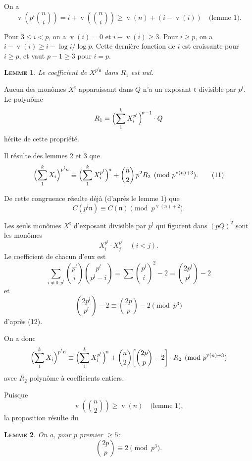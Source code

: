 \documentclass[12pt]{amsart}
\theoremstyle{plain}
\newtheorem{lem}{\textsc{Lemme}}
\DeclareMathOperator{\vord}{v}
\begin{document}
On a
\[
\vord\!\left(p^i \binom{n}{i}\right) = i + \vord\!\left(\binom{n}{i}\right) \geqslant \vord(n) + (i - \vord(i)) \quad \text{(lemme 1)}.
\]

Pour $3 \leqslant i < p$, on a $\vord(i) = 0$ et $i - \vord(i) \geqslant 3$. Pour $i \geqslant p$, on a
$i - \vord(i) \geqslant i - \log i/\log p$. Cette derni\`ere fonction de $i$ est croissante pour
$i \geqslant p$, et vaut $p - 1 \geqslant 3$ pour $i = p$.

\begin{lem}
Le coefficient de $X^{p^l \mathfrak{n}}$ dans $R_1$ est nul.
\end{lem}

Aucun des mon\^omes $X^{\mathfrak{r}}$ apparaissant dans $Q$ n'a un exposant $\mathfrak{r}$ divisible
par $p^l$. Le polyn\^ome
\[
R_1 = \Bigl(\sum_1^k X_i^{p^l}\Bigr)^{\!n-1} \cdot Q
\]
h\'erite de cette propri\'et\'e.

Il r\'esulte des lemmes 2 et 3 que
\begin{equation}
\Bigl(\sum_1^k X_i\Bigr)^{p^l n} \equiv \Bigl(\sum_1^k X_i^{p^l}\Bigr)^{\!n} + \binom{n}{2}\, p^2 R_2 \pmod{p^{\vord(n)+3}}.\tag{11}
\end{equation}

De cette congruence r\'esulte d\'ej\`a (d'apr\`es le lemme 1) que
\begin{equation}
C(p^l \mathfrak{n}) \equiv C(\mathfrak{n}) \pmod{p^{\vord(n)+2}}.\tag{12}
\end{equation}

Les seuls mon\^omes $X^{\mathfrak{r}}$ d'exposant divisible par $p^l$ qui figurent dans $(pQ)^2$
sont les mon\^omes
\[
X_i^{p^l} \cdot X_j^{p^l} \quad (i < j).
\]
Le coefficient de chacun d'eux est
\begin{equation}
\sum_{i \neq 0, p^l} \binom{p^l}{i} \binom{p^l}{p^l-i} = \sum \binom{p^l}{i}^{\!2} - 2 = \binom{2p^l}{p^l} - 2\tag{13}
\end{equation}
et
\[
\binom{2p^l}{p^l} - 2 \equiv \binom{2p}{p} - 2 \pmod{p^3}
\]
d'apr\`es (12).

On a donc
\[
\Bigl(\sum_1^k X_i\Bigr)^{p^l n} \equiv \Bigl(\sum_1^k X_i^{p^l}\Bigr)^{\!n} + \binom{n}{2} \biggl[\binom{2p}{p} - 2\biggr] \cdot R_2 \pmod{p^{\vord(n)+3}}
\]
avec $R_2$ polyn\^ome \`a coefficients entiers.

Puisque
\[
\vord\!\left(\binom{n}{2}\right) \geqslant \vord(n) \quad \text{(lemme 1)},
\]
la proposition r\'esulte du

\begin{lem}
On a, pour $p$ premier $\geqslant 5$:
\[
\binom{2p}{p} \equiv 2 \pmod{p^3}.
\]
\end{lem}
\end{document}
